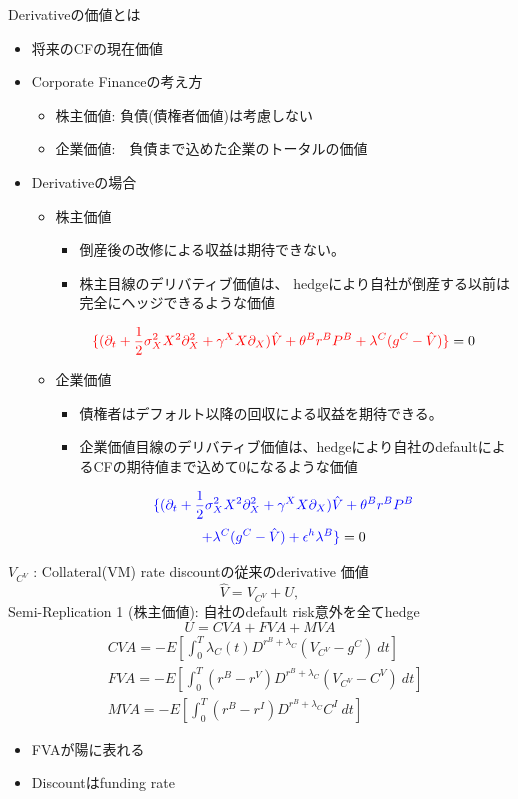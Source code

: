 \documentclass[driverfallback=dvipdfmx,cjk]{beamer}
\begin{document}
\begin{frame}
    Derivativeの価値とは
    \begin{itemize}
        \item 将来のCFの現在価値
        \item Corporate Financeの考え方
        \begin{itemize}
            \item 株主価値: 負債(債権者価値)は考慮しない
            \item 企業価値:　負債まで込めた企業のトータルの価値
        \end{itemize}
        \item Derivativeの場合 
        \begin{itemize}
            \item 株主価値 
            \begin{itemize}
                \item 倒産後の改修による収益は期待できない。
                \item 株主目線のデリバティブ価値は、 hedgeにより自社が倒産する以前は完全にヘッジできるような価値
            \end{itemize}
                $$\textcolor{red}{\{ (\partial_t + \frac{1}{2}\sigma_X^2 X^2 \partial^2_{X}+ \gamma^X X \partial_{X}) \hat{V} + \theta^B r^B P^B + \lambda^C(g^C-\hat{V})  \}}=0$$
            \item 企業価値 
          \begin{itemize}
              \item 債権者はデフォルト以降の回収による収益を期待できる。　
              \item 企業価値目線のデリバティブ価値は、hedgeにより自社のdefaultによるCFの期待値まで込めて0になるような価値
          \end{itemize}  
$$\textcolor{blue}{\{ (\partial_t + \frac{1}{2}\sigma_X^2 X^2 \partial^2_{X}+ \gamma^X X \partial_{X}) \hat{V} + \theta^B r^B P^B}$$
$$\textcolor{blue}{+ \lambda^C(g^C-\hat{V})+\epsilon^h \lambda^B\}}=0$$

        \end{itemize}
    \end{itemize}
\end{frame}

\begin{frame}
    $V_{C^V}$ : Collateral(VM) rate discountの従来のderivative 価値
    $$ \hat{V} = V_{C^V} + U,$$  
    Semi-Replication 1 (株主価値): 自社のdefault risk意外を全てhedge
   $$ U = CVA + FVA + MVA $$
   \begin{align*}
    &CVA = -E[\int_0^T \lambda_C(t) D^{r^B + \lambda_C}(V_{C^V}-g^C) \ dt]\\
    &FVA = -E[\int_0^T (r^B - r^V) D^{r^B + \lambda_C}(V_{C^V}-C^V) \ dt]\\
    &MVA = -E[\int_0^T (r^B - r^I) D^{r^B + \lambda_C}C^I \  dt]
   \end{align*}
   \begin{itemize}
       \item FVAが陽に表れる
       \item Discountはfunding rate 
   \end{itemize}
\end{frame}
\end{document}
